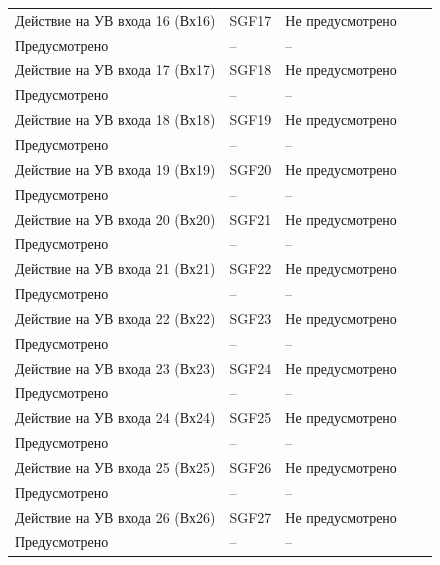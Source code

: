 \begin{longtable}{|>{\centering\arraybackslash}m{5.3cm}|>{\centering\arraybackslash}m{3.3cm}|>{\centering\arraybackslash}m{4.2cm}|>{\centering\arraybackslash}m{1.8cm}|>{\centering\arraybackslash}m{1cm}|}
\hline
\centering Действие на УВ входа 16 (Вх16)  & \centering SGF17 & \centering Не предусмотрено \\ Предусмотрено & \centering -- & \centering \arraybackslash -- \\
\hline
\centering Действие на УВ входа 17 (Вх17)  & \centering SGF18 & \centering Не предусмотрено \\ Предусмотрено & \centering -- & \centering \arraybackslash -- \\
\hline
\centering Действие на УВ входа 18 (Вх18)  & \centering SGF19 & \centering Не предусмотрено \\ Предусмотрено & \centering -- & \centering \arraybackslash -- \\
\hline
\centering Действие на УВ входа 19 (Вх19)  & \centering SGF20 & \centering Не предусмотрено \\ Предусмотрено & \centering -- & \centering \arraybackslash -- \\
\hline
\centering Действие на УВ входа 20 (Вх20)  & \centering SGF21 & \centering Не предусмотрено \\ Предусмотрено & \centering -- & \centering \arraybackslash -- \\
\hline
\centering Действие на УВ входа 21 (Вх21)  & \centering SGF22 & \centering Не предусмотрено \\ Предусмотрено & \centering -- & \centering \arraybackslash -- \\
\hline
\centering Действие на УВ входа 22 (Вх22)  & \centering SGF23 & \centering Не предусмотрено \\ Предусмотрено & \centering -- & \centering \arraybackslash -- \\
\hline
\centering Действие на УВ входа 23 (Вх23)  & \centering SGF24 & \centering Не предусмотрено \\ Предусмотрено & \centering -- & \centering \arraybackslash -- \\
\hline
\centering Действие на УВ входа 24 (Вх24)  & \centering SGF25 & \centering Не предусмотрено \\ Предусмотрено & \centering -- & \centering \arraybackslash -- \\
\hline
\centering Действие на УВ входа 25 (Вх25)  & \centering SGF26 & \centering Не предусмотрено \\ Предусмотрено & \centering -- & \centering \arraybackslash -- \\
\hline
\centering Действие на УВ входа 26 (Вх26)  & \centering SGF27 & \centering Не предусмотрено \\ Предусмотрено & \centering -- & \centering \arraybackslash -- \\

\end{longtable}
